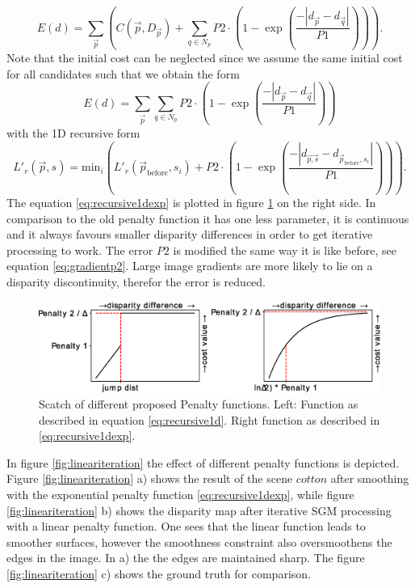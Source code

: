 \documentclass  [
  paper    = a4,
  BCOR     = 10mm,
  twoside,
  fontsize = 12pt,
  fleqn,
  toc      = bibnumbered,
  toc      = listofnumbered,
  numbers  = noendperiod,
  headings = normal,
  listof   = leveldown,
  version  = 3.03
]                                       {scrreprt}
\begin{document}
\begin{equation}\label{eq:global_sgm_function}
E(d) = \sum_{\vec p} \left(C(\vec{p}, D_{\vec p}) + \sum_{q\in N_p} 
P2\cdot \left(1- \exp\left(\frac{-|d_{\vec{p}} - d_{\vec{q}}|}{P1}\right)\right)
\right).
\end{equation}
Note that the initial cost can be neglected since we assume the same initial cost for all candidates such that we obtain the form
\begin{equation}\label{eq:global_sgm_function_wo}
E(d) = \sum_{\vec p}\sum_{q\in N_p} 
P2\cdot \left(1- \exp\left(\frac{-|d_{\vec{p}} - d_{\vec{q}}|}{P1}\right)\right)
\end{equation}
with the 1D recursive form
\begin{equation}\label{eq:recursive1dexp}
L'_r(\vec{p}, s) = \text{min}_i\left( L'_r(\vec{p}_\text{before}, s_i) + P2\cdot \left(1- \exp\left(\frac{-|d_{\vec{p,s}} - d_{\vec{p}_\text{before}, s_i}|}{P1}\right)\right)\right).
\end{equation}
The equation \ref{eq:recursive1dexp} is plotted in figure \ref{fig:penaltyfunction} on the right side. In comparison to the old penalty function it has one less parameter, it is continuous and it always favours smaller disparity differences in order to get iterative processing to work. The error $P2$ is modified the same way it is like before, see equation \ref{eq:gradientp2}. Large image gradients are more likely to lie on a disparity discontinuity, therefor the error is reduced.
\begin{figure}
	\centering
	\includegraphics[width=0.7\linewidth]{images/penalty_function}
	\caption[Penalty function]{Scatch of different proposed Penalty functions. Left: Function as described in equation \ref{eq:recursive1d}. Right function as described in \ref{eq:recursive1dexp}.}
	\label{fig:penaltyfunction}
\end{figure}
In figure \ref{fig:lineariteration} the effect of different penalty functions is depicted. Figure \ref{fig:lineariteration} a) shows the result of the scene $cotton$ after smoothing with the exponential penalty function \ref{eq:recursive1dexp}, while figure \ref{fig:lineariteration} b) shows the disparity map after iterative SGM processing with a linear penalty function. One sees that the linear function leads to smoother surfaces, however the smoothness constraint also oversmoothens the edges in the image. In a) the the edges are maintained sharp. The figure \ref{fig:lineariteration} c) shows the ground truth for comparison. 
\end{document}
